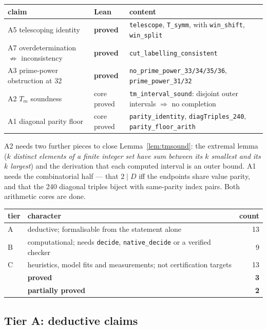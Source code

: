 \documentclass[11pt,a4paper]{article}
\theoremstyle{definition}
\begin{document}
\begin{center}
\begin{tabular}{@{}lll@{}}
\toprule
claim & Lean & content \\
\midrule
A5 telescoping identity & \textbf{proved} & \texttt{telescope}, \texttt{T\_symm}, with \texttt{win\_shift}, \texttt{win\_split} \\
A7 overdetermination $\not\Rightarrow$ inconsistency & \textbf{proved} & \texttt{cut\_labelling\_consistent} \\
A3 prime-power obstruction at 32 & \textbf{proved} & \texttt{no\_prime\_power\_33/34/35/36}, \texttt{prime\_power\_31/32} \\
A2 $T_m$ soundness & core proved & \texttt{tm\_interval\_sound}: disjoint outer intervals $\Rightarrow$ no completion \\
A1 diagonal parity floor & core proved & \texttt{parity\_identity}, \texttt{diagTriples\_240}, \texttt{parity\_floor\_arith} \\
\bottomrule
\end{tabular}
\end{center}

\noindent A2 needs two further pieces to close Lemma~\ref{lem:tmsound}: the
extremal lemma (\emph{$k$ distinct elements of a finite integer set have sum
between its $k$ smallest and its $k$ largest}) and the derivation that each
computed interval is an outer bound. A1 needs the combinatorial half --- that
$2\mid D$ iff the endpoints share value parity, and that the 240 diagonal triples
biject with same-parity index pairs. Both arithmetic cores are done.

\begin{center}
\begin{tabular}{@{}llr@{}}
\toprule
tier & character & count \\
\midrule
A & deductive; formalisable from the statement alone & 13 \\
B & computational; needs \texttt{decide}, \texttt{native\_decide} or a verified checker & 9 \\
C & heuristics, model fits and measurements; not certification targets & 13 \\
\midrule
 & \textbf{proved} & \textbf{3} \\
 & \textbf{partially proved} & \textbf{2} \\
\bottomrule
\end{tabular}
\end{center}

\subsection{Tier A: deductive claims}
\end{document}
